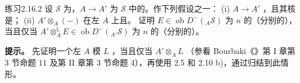 \begin{SGAresult}{练习}{2.16.2}
设 $\mathscr S$ 为，$A\to A'$ 为 $\mathscr S$ 中的。作下列假设之一：
(i) $A\to A'$ ，且其核是；
(ii)  $A'\otimes_A(-)$ 在左 $A$ 上且。
证明 $E\in\operatorname{ob}D^-({}_A\mathscr S)$ 为 $n$ 的（分别的），当且仅当 $A'\otimes_A^{\mathbb L}E\in\operatorname{ob}D^-({}_{A'}\mathscr S)$ 为 $n$ 的（分别的）。
\end{SGAresult}
\textbf{提示。} 先证明一个左 $A$ 模 $L$ ，当且仅当 $A'\otimes_A L$ （参看 Bourbaki《》第 I 章第 3 节命题 11 及第 II 章第 3 节命题 4），再使用 2.5 和 2.10 b)，通过归结到此情形。
